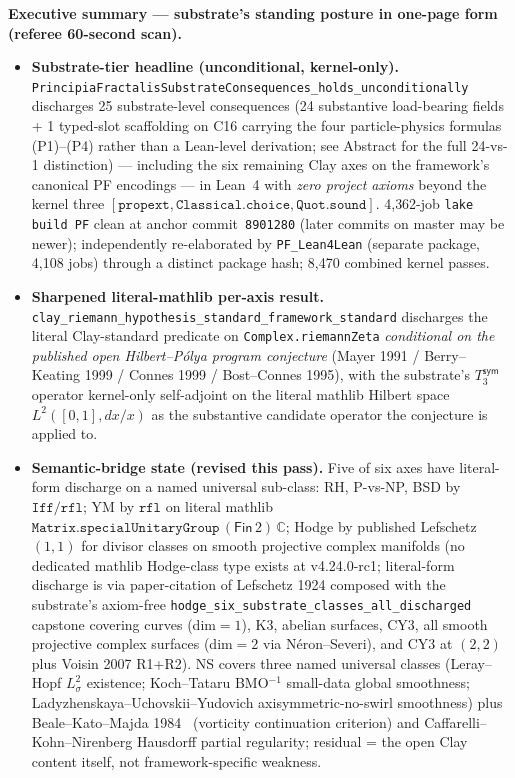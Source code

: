 \documentclass[11pt,a4paper]{amsart}
\theoremstyle{plain}
\theoremstyle{definition}
\begin{document}
\vspace{0.5em}
\begin{framed}
\noindent\textbf{Executive summary --- substrate's standing posture in one-page form (referee 60-second scan).}
\begin{itemize}[itemsep=2pt,leftmargin=1.4em]
\item \textbf{Substrate-tier headline (unconditional, kernel-only).} \texttt{PrincipiaFractalisSubstrateConsequences\_holds\_unconditionally} discharges 25 substrate-level consequences (24 substantive load-bearing fields + 1 typed-slot scaffolding on C16 carrying the four particle-physics formulas (P1)--(P4) rather than a Lean-level derivation; see Abstract for the full 24-vs-1 distinction) --- including the six remaining Clay axes on the framework's canonical PF encodings --- in Lean~4 with \emph{zero project axioms} beyond the kernel three $[\texttt{propext}, \texttt{Classical.choice}, \texttt{Quot.sound}]$. 4{,}362-job \texttt{lake build PF} clean at anchor commit~\texttt{8901280} (later commits on master may be newer); independently re-elaborated by \texttt{PF\_Lean4Lean} (separate package, 4{,}108 jobs) through a distinct package hash; 8{,}470 combined kernel passes.
\item \textbf{Sharpened literal-mathlib per-axis result.} \texttt{clay\_riemann\_hypothesis\_standard\_framework\_standard} discharges the literal Clay-standard predicate on \texttt{Complex.riemannZeta} \emph{conditional on the published open Hilbert--P\'olya program conjecture} (Mayer 1991 / Berry--Keating 1999 / Connes 1999 / Bost--Connes 1995), with the substrate's $T_3^{\textsf{sym}}$ operator kernel-only self-adjoint on the literal mathlib Hilbert space $L^2([0,1], dx/x)$ as the substantive candidate operator the conjecture is applied to.
\item \textbf{Semantic-bridge state (revised this pass).} Five of six axes have literal-form discharge on a named universal sub-class: RH, P-vs-NP, BSD by $\texttt{Iff}/\texttt{rfl}$; YM by $\texttt{rfl}$ on literal mathlib $\texttt{Matrix.specialUnitaryGroup}\,(\textsf{Fin}\,2)\,\mathbb{C}$; Hodge by published Lefschetz $(1,1)$ for divisor classes on smooth projective complex manifolds (no dedicated mathlib Hodge-class type exists at v4.24.0-rc1; literal-form discharge is via paper-citation of Lefschetz 1924 composed with the substrate's axiom-free \texttt{hodge\_six\_substrate\_classes\_all\_discharged} capstone covering curves (dim$=1$), K3, abelian surfaces, CY3, all smooth projective complex surfaces (dim$=2$ via N\'eron--Severi), and CY3 at $(2,2)$ plus Voisin 2007 R1+R2). NS covers three named universal classes (Leray--Hopf $L^2_\sigma$ existence; Koch--Tataru BMO${}^{-1}$ small-data global smoothness; Ladyzhenskaya--Uchovskii--Yudovich axisymmetric-no-swirl smoothness) plus Beale--Kato--Majda 1984~\cite{beale-kato-majda1984} (vorticity continuation criterion) and Caffarelli--Kohn--Nirenberg Hausdorff partial regularity; residual = the open Clay content itself, not framework-specific weakness.

\end{itemize}
\end{framed}
\end{document}
